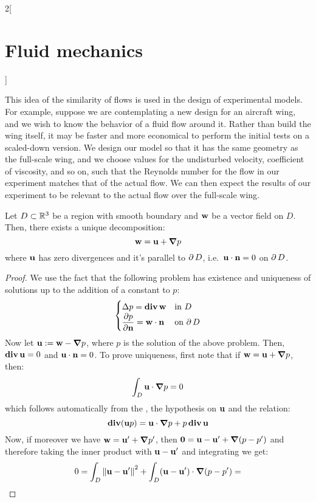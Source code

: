 \documentclass[../../../main_physics.tex]{subfiles}
\begin{document}
\begin{multicols}{2}[\section{Fluid mechanics}]
\begin{definition}
  \end{definition}
  \begin{remark}
    This idea of the similarity of flows is used in the design of experimental models. For example, suppose we are contemplating a new design for an aircraft wing, and we wish to know the behavior of a fluid flow around it. Rather than build the wing itself, it may be faster and more economical to perform the initial tests on a scaled-down version. We design our model so that it has the same geometry as the full-scale wing, and we choose values for the undisturbed velocity, coefficient of viscosity, and so on, such that the Reynolds number for the flow in our experiment matches that of the actual flow. We can then expect the results of our experiment to be relevant to the actual flow over the full-scale wing.
  \end{remark}
  \begin{theorem}
    Let $D\subset\mathbb{R}^3$ be a region with smooth boundary and $\boldsymbol{\mathrm{w}}$ be a vector field on $D$. Then, there exists a unique decomposition:
    $$
      \boldsymbol{\mathrm{w}}=\boldsymbol{\mathrm{u}}+\grad p
    $$
    where $\boldsymbol{\mathrm{u}}$ has zero divergences and it's parallel to $\operatorname{\partial}{D}$, i.e.\ $\boldsymbol{\mathrm{u}}\cdot\boldsymbol{\mathrm{n}}=0$ on $\operatorname{\partial}{D}$.
  \end{theorem}
  \begin{proof}
    We use the fact that the following problem has existence and uniqueness of solutions up to the addition of a constant to $p$:
    $$
      \begin{cases}
        \displaystyle\Delta p =\operatorname{\boldsymbol{\mathrm{div}}} \boldsymbol{\mathrm{w}}           & \text{in $D$}      \\
        \displaystyle \pdv{p}{\boldsymbol{\mathrm{n}}}=\boldsymbol{\mathrm{w}}\cdot \boldsymbol{\mathrm{n}} & \text{on $\operatorname{\partial}{D}$}
      \end{cases}
    $$
    Now let $\boldsymbol{\mathrm{u}}:=\boldsymbol{\mathrm{w}}-\grad p$, where $p$ is the solution of the above problem. Then, $\operatorname{\boldsymbol{\mathrm{div}}} \boldsymbol{\mathrm{u}}=0$ and $\boldsymbol{\mathrm{u}}\cdot\boldsymbol{\mathrm{n}}=0$. To prove uniqueness, first note that if $\boldsymbol{\mathrm{w}}=\boldsymbol{\mathrm{u}}+\grad p$, then:
    $$
      \int_D\boldsymbol{\mathrm{u}}\cdot \grad p=0
    $$
    which follows automatically from the , the hypothesis on $\boldsymbol{\mathrm{u}}$ and the relation:
    $$
      \operatorname{\boldsymbol{\mathrm{div}}}(\boldsymbol{\mathrm{u}}p)=\boldsymbol{\mathrm{u}}\cdot\grad p+p\operatorname{\boldsymbol{\mathrm{div}}}\boldsymbol{\mathrm{u}}
    $$
    Now, if moreover we have $\boldsymbol{\mathrm{w}}=\boldsymbol{\mathrm{u}}'+\grad p'$, then $\boldsymbol{\mathrm{0}}= \boldsymbol{\mathrm{u}}-\boldsymbol{\mathrm{u}}' + \grad(p-p')$ and therefore taking the inner product with $\boldsymbol{\mathrm{u}}-\boldsymbol{\mathrm{u}}'$ and integrating we get:
    \begin{multline*}
      0=\int_D\norm{\vf{u}-\vf{u}'}^2+\int_D(\vf{u}-\vf{u}')\cdot\grad(p-p')= \\

\end{multline*}
\end{proof}
\end{multicols}
\end{document}
